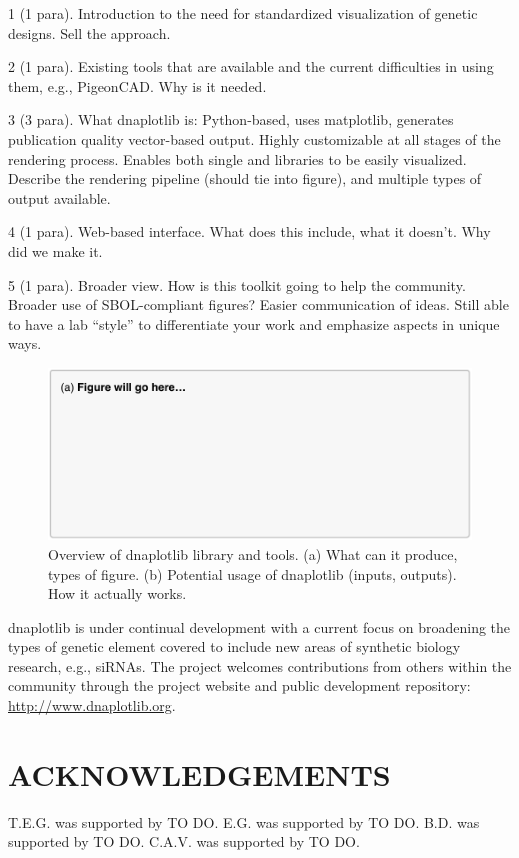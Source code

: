 \documentclass{bioinfo}
\begin{document}
1 (1 para). Introduction to the need for standardized visualization of genetic designs. Sell the approach.

2 (1 para). Existing tools that are available and the current difficulties in using them, e.g., PigeonCAD. Why is it needed.

3 (3 para). What dnaplotlib is: Python-based, uses matplotlib, generates publication quality vector-based output. Highly customizable at all stages of the rendering process. Enables both single and libraries to be easily visualized. Describe the rendering pipeline (should tie into figure), and multiple types of output available.

4 (1 para). Web-based interface. What does this include, what it doesn't. Why did we make it.

5 (1 para). Broader view. How is this toolkit going to help the community. Broader use of SBOL-compliant figures? Easier communication of ideas. Still able to have a lab ``style'' to differentiate your work and emphasize aspects in unique ways.

\begin{figure}[t]
\centering
\includegraphics[width=\textwidth]{Figure1.pdf}
\caption{\label{fig:overview}Overview of dnaplotlib library and tools. (a) What can it produce, types of figure. (b) Potential usage of dnaplotlib (inputs, outputs). How it actually works.}
\end{figure}

dnaplotlib is under continual development with a current focus on broadening the types of genetic element covered to include new areas of synthetic biology research, e.g., siRNAs. The project welcomes contributions from others within the community through the project website and public development repository: \href{http://www.dnaplotlib.org}{http://www.dnaplotlib.org}.

\section*{ACKNOWLEDGEMENTS}
T.E.G. was supported by TO DO. E.G. was supported by TO DO. B.D. was supported by TO DO. C.A.V. was supported by TO DO.
\end{document}
